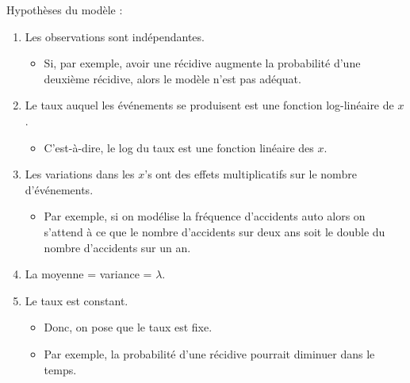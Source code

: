 \documentclass[10pt, french]{article}
\begin{document}
\begin{multicols*}{2}
Hypothèses du modèle :
\begin{enumerate}
	\item	Les observations sont indépendantes.
		\begin{itemize}
		\item	Si, par exemple, avoir une récidive augmente la probabilité d'une deuxième récidive, alors le modèle n'est pas adéquat.
		\end{itemize}
	\item	Le taux auquel les événements se produisent est une fonction log-linéaire de $x$.
		\begin{itemize}
		\item	C'est-à-dire, le log du taux est une fonction linéaire des $x$.
		\end{itemize}
	\item	Les variations dans les $x$'s ont des effets multiplicatifs sur le nombre d'événements.
		\begin{itemize}
		\item	Par exemple, si on modélise la fréquence d'accidents auto alors on s'attend à ce que le nombre d'accidents sur deux ans soit le double du nombre d'accidents sur un an.
		\end{itemize}
	\item	La moyenne = variance = $\lambda$.
	\item	Le taux est constant.
		\begin{itemize}
		\item	Donc, on pose que le taux est fixe.
		\item	Par exemple, la probabilité d'une récidive pourrait diminuer dans le temps.
		\end{itemize}
\end{enumerate}


\end{multicols*}
\end{document}
